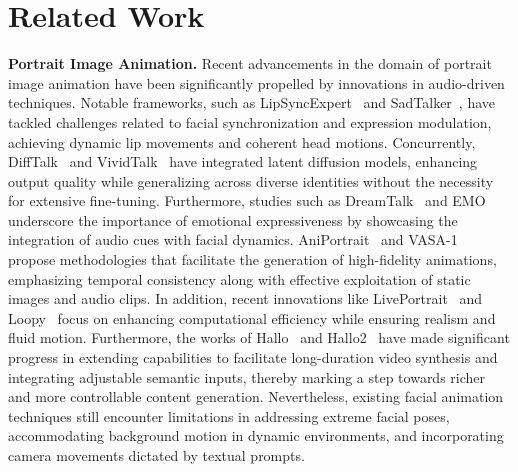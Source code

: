 \section{Related Work}
\noindent\textbf{Portrait Image Animation.}
Recent advancements in the domain of portrait image animation have been significantly propelled by innovations in audio-driven techniques. 
Notable frameworks, such as LipSyncExpert~\cite{prajwal2020lip} and SadTalker~\cite{zhang2023sadtalker}, have tackled challenges related to facial synchronization and expression modulation, achieving dynamic lip movements and coherent head motions. 
Concurrently, DiffTalk~\cite{shen2023difftalk} and VividTalk~\cite{sun2023vividtalk} have integrated latent diffusion models, enhancing output quality while generalizing across diverse identities without the necessity for extensive fine-tuning. 
Furthermore, studies such as DreamTalk~\cite{ma2023dreamtalk} and EMO~\cite{tian2024emo} underscore the importance of emotional expressiveness by showcasing the integration of audio cues with facial dynamics. 
AniPortrait~\cite{wei2024aniportrait} and VASA-1~\cite{xu2024vasa} propose methodologies that facilitate the generation of high-fidelity animations, emphasizing temporal consistency along with effective exploitation of static images and audio clips. 
In addition, recent innovations like LivePortrait~\cite{guo2024liveportrait} and Loopy~\cite{jiang2024loopy} focus on enhancing computational efficiency while ensuring realism and fluid motion. 
Furthermore, the works of Hallo~\cite{xu2024hallo} and Hallo2~\cite{cui2024hallo2} have made significant progress in extending capabilities to facilitate long-duration video synthesis and integrating adjustable semantic inputs, thereby marking a step towards richer and more controllable content generation. 
Nevertheless, existing facial animation techniques still encounter limitations in addressing extreme facial poses, accommodating background motion in dynamic environments, and incorporating camera movements dictated by textual prompts.

